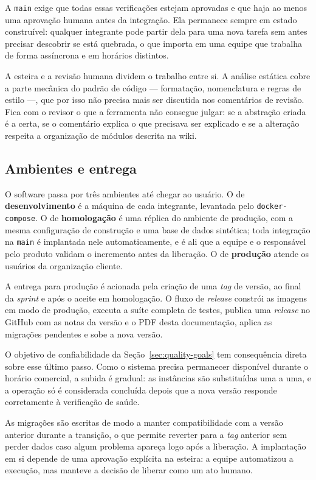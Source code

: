 \documentclass[a4paper,12pt,oneside,openany]{book}
\begin{document}
A \texttt{main} exige que todas essas verificações estejam aprovadas e que haja
ao menos uma aprovação humana antes da integração. Ela permanece sempre em
estado construível: qualquer integrante pode partir dela para uma nova tarefa
sem antes precisar descobrir se está quebrada, o que importa em uma equipe que
trabalha de forma assíncrona e em horários distintos.

A esteira e a revisão humana dividem o trabalho entre si. A análise
estática cobre a parte mecânica do padrão de código --- formatação,
nomenclatura e regras de estilo ---, que por isso não precisa mais ser
discutida nos comentários de revisão. Fica com o revisor o que a ferramenta não
consegue julgar: se a abstração criada é a certa, se o comentário explica o que
precisava ser explicado e se a alteração respeita a organização de módulos
descrita na wiki.

\subsection{Ambientes e entrega}

O software passa por três ambientes até chegar ao usuário. O de
\textbf{desenvolvimento} é a máquina de cada integrante, levantada pelo
\texttt{docker-compose}. O de \textbf{homologação} é uma réplica do ambiente de
produção, com a mesma configuração de construção e uma base de dados sintética;
toda integração na \texttt{main} é implantada nele automaticamente, e é ali que
a equipe e o responsável pelo produto validam o incremento antes da liberação.
O de \textbf{produção} atende os usuários da organização cliente.

A entrega para produção é acionada pela criação de uma \textit{tag} de versão,
ao final da \textit{sprint} e após o aceite em homologação. O fluxo de
\textit{release} constrói as imagens em modo de produção, executa a suíte
completa de testes, publica uma \textit{release} no GitHub com as notas da
versão e o PDF desta documentação, aplica as migrações pendentes e sobe a nova
versão.

O objetivo de confiabilidade da Seção~\ref{sec:quality-goals} tem consequência
direta sobre esse último passo. Como o sistema precisa permanecer disponível
durante o horário comercial, a subida é gradual: as instâncias são substituídas
uma a uma, e a operação só é considerada concluída depois que a nova versão
responde corretamente à verificação de saúde.

As migrações são escritas de modo a manter compatibilidade com a versão
anterior durante a transição, o que permite reverter para a \textit{tag}
anterior sem perder dados caso algum problema apareça logo após a liberação. A
implantação em si depende de uma aprovação explícita na esteira: a equipe
automatizou a execução, mas manteve a decisão de liberar como um ato humano.
\end{document}
